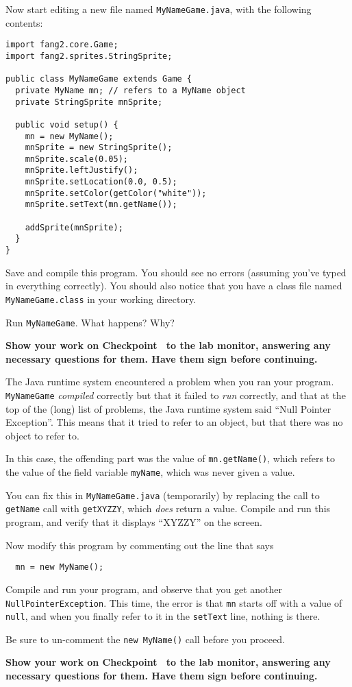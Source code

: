 \documentclass[12pt,twoside]{memoir}
\newcommand\code[1]{\lstinline^#1^}
\newenvironment{Checkpoint}[1]{%
\begin{Exercise}[name={Checkpoint},title={#1}]}{%
\end{Exercise}%
\textbf{Show your work on Checkpoint~\theExercise{} to the lab monitor, %
  answering any necessary questions for them.  Have them sign before continuing.}}
\begin{document}
\begin{Checkpoint}{Using \code{MyName} in a \code{Game}.}
Now start editing a new file named \code{MyNameGame.java}, with the
following contents:

\begin{lstlisting}
import fang2.core.Game;
import fang2.sprites.StringSprite;

public class MyNameGame extends Game {
  private MyName mn; // refers to a MyName object
  private StringSprite mnSprite;

  public void setup() {
    mn = new MyName();
    mnSprite = new StringSprite();
    mnSprite.scale(0.05);
    mnSprite.leftJustify();
    mnSprite.setLocation(0.0, 0.5);
    mnSprite.setColor(getColor("white"));
    mnSprite.setText(mn.getName());
    
    addSprite(mnSprite);
  }
}
\end{lstlisting}

Save and compile this program.  You should see no errors (assuming
you've typed in everything correctly). You should also notice that
you have a class file named \code{MyNameGame.class} in your working
directory.

Run \code{MyNameGame}. What happens? Why?
\end{Checkpoint}    

\begin{Checkpoint}{\code{NullPointerException}}

  The Java runtime system encountered a problem when you ran your
  program. \code{MyNameGame} \emph{compiled} correctly but that it
  failed to \emph{run} correctly, and that at the top of the (long)
  list of problems, the Java runtime system said ``Null Pointer
  Exception''.  This means that it tried to refer to an object, but
  that there was no object to refer to.

  In this case, the offending part was the value of
  \code{mn.getName()}, which refers to the value of the field variable
  \code{myName}, which was never given a value.

  You can fix this in \code{MyNameGame.java} (temporarily) by
  replacing the call to \code{getName} call with \code{getXYZZY},
  which {\em does} return a value.  Compile and run this program, and
  verify that it displays ``XYZZY'' on the screen.

  Now modify this program by commenting out the line that says

\begin{lstlisting}
  mn = new MyName();
\end{lstlisting}

Compile and run your program, and observe that you get another
\code{NullPointerException}. This time, the error is that \code{mn}
starts off with a value of \code{null}, and when you finally refer to
it in the \code{setText} line, nothing is there.

Be sure to un-comment the \code{new MyName()} call before you proceed.
\end{Checkpoint}
\end{document}
